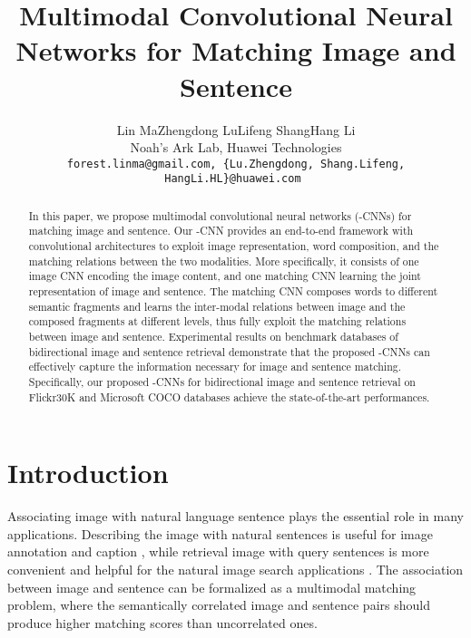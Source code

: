 \documentclass[10pt,twocolumn,letterpaper]{article}
\begin{document}
\title{Multimodal Convolutional Neural Networks for Matching Image and Sentence}

\author{Lin Ma\qquad Zhengdong Lu\qquad Lifeng Shang\qquad Hang Li\\
Noah's Ark Lab, Huawei Technologies\\
{\tt\footnotesize forest.linma@gmail.com, \{Lu.Zhengdong, Shang.Lifeng, HangLi.HL\}@huawei.com }
}

\maketitle


\begin{abstract}
  In this paper, we propose multimodal convolutional neural networks (-CNNs) for matching image and sentence.  Our -CNN provides an end-to-end framework with convolutional architectures to exploit image representation, word composition, and the matching relations between the two modalities. More specifically, it consists of one image CNN encoding the image content, and one matching CNN learning the joint representation of image and sentence. The matching CNN composes words to different semantic fragments  and learns the inter-modal relations between image and the composed fragments at different levels, thus fully exploit the matching relations between image and sentence. Experimental results on benchmark databases of bidirectional image and sentence retrieval demonstrate that the proposed -CNNs can effectively capture the information necessary for image and sentence matching.  Specifically, our proposed -CNNs for bidirectional image and sentence retrieval on Flickr30K and Microsoft COCO databases achieve the state-of-the-art performances.





\end{abstract}



\section{Introduction}
Associating image with natural language sentence plays the essential role in many applications. Describing the image with natural sentences is useful for image annotation and caption \cite{gong_eccv2014,kiros_nips2012,ordonez_nips2011}, while retrieval image with query sentences is more convenient and helpful for the natural image search applications \cite{hodosh_jair2013,karpathy_2014}. The association between image and sentence can be formalized as a multimodal matching problem, where the semantically correlated image and sentence pairs should produce higher matching scores than uncorrelated ones. 
\end{document}
